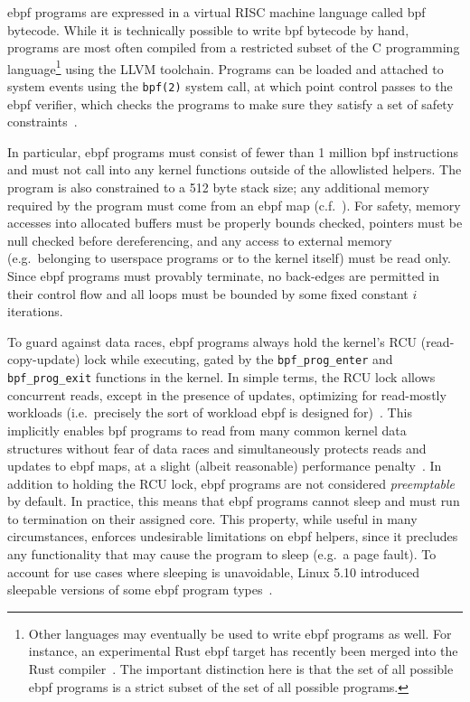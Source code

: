 \gls{ebpf} programs are expressed in a virtual RISC machine language called \gls{bpf}
bytecode.  While it is technically possible to write \gls{bpf} bytecode by hand, programs
are most often compiled from a restricted subset of the C programming
language\footnote{Other languages may eventually be used to write \gls{ebpf} programs as
well.  For instance, an experimental Rust \gls{ebpf} target has recently been merged into
the Rust compiler~\cite{decina2021_bpf_rust}. The important distinction here is that the
set of all possible \gls{ebpf} programs is a strict subset of the set of all possible
programs.} using the LLVM toolchain. Programs can be loaded and attached to system events
using the \texttt{bpf(2)} system call, at which point control passes to the \gls{ebpf}
verifier, which checks the programs to make sure they satisfy a set of safety
constraints~\cite{starovoitov2014_ebpf, gregg2019_bpf}.

In particular, \gls{ebpf} programs must consist of fewer than 1 million \gls{bpf}
instructions and must not call into any kernel functions outside of the allowlisted
helpers. The program is also constrained to a 512 byte stack size; any additional memory
required by the program must come from an \gls{ebpf} map (c.f.\ ). For
safety, memory accesses into allocated buffers must be properly bounds checked, pointers
must be null checked before dereferencing, and any access to external memory
(e.g.\ belonging to userspace programs or to the kernel itself) must be read only. Since
\gls{ebpf} programs must provably terminate, no back-edges are permitted in their control
flow and all loops must be bounded by some fixed constant $i$ iterations.

To guard against data races, \gls{ebpf} programs always hold the kernel's RCU (read-copy-update)
lock while executing, gated by the \texttt{bpf\_prog\_enter} and \texttt{bpf\_prog\_exit}
functions in the kernel. In simple terms, the RCU lock allows concurrent reads, except in
the presence of updates, optimizing for read-mostly workloads (i.e.\ precisely the sort of
workload \gls{ebpf} is designed for)~\cite{mckenney2007_rcu}. This implicitly enables \gls{bpf}
programs to read from many common kernel data structures without fear of data races and
simultaneously protects reads and updates to \gls{ebpf} maps, at a slight (albeit reasonable)
performance penalty~\cite{mckenney2007_rcu}. In addition to holding the RCU lock, \gls{ebpf}
programs are not considered \textit{preemptable} by default. In practice, this means that
\gls{ebpf} programs cannot sleep and must run to termination on their assigned core. This
property, while useful in many circumstances, enforces undesirable limitations on \gls{ebpf}
helpers, since it precludes any functionality that may cause the program to sleep (e.g.\ a
page fault). To account for use cases where sleeping is unavoidable, Linux 5.10 introduced
sleepable versions of some \gls{ebpf} program types~\cite{starovoitov2020_sleepable}.

